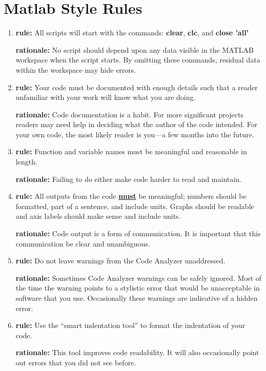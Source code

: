 \documentclass{tufte-book}
\theoremstyle{break}
\begin{document}
\chapter{Matlab Style Rules}
\begin{enumerate}
\item \textbf{rule:} All scripts will start with the commands: \textbf{clear}, \textbf{clc}, and \textbf{close 'all'}

\textbf{rationale:} No script should depend upon any data visible in the MATLAB workspace when the script starts.  By omitting these commands, residual data within the workspace may hide errors.

\item \textbf{rule:} Your code must be documented with enough details such that a reader unfamiliar with your work will know what you are doing.

\textbf{rationale:} Code documentation is a habit. For more significant projects readers may need help in deciding what the author of the code intended.  For your own code, the most likely reader is you---a few months into the future.

\item \textbf{rule:} Function and variable names must be meaningful and reasonable in length.

\textbf{rationale:} Failing to do either make code harder to read and maintain.

\item \textbf{rule:} All outputs from the code \underline{\textbf{must}} be meaningful; numbers should be formatted, part of a sentence, and include units. Graphs should be readable and axis labels should make sense and include units.

\textbf{rationale:} Code output is a form of communication. It is important that this communication be clear and unambiguous.

\item \textbf{rule:} Do not leave warnings from the Code Analyzer unaddressed.

\textbf{rationale:} Sometimes Code Analyzer warnings can be safely ignored.  Most of the time the warning points to a stylistic error that would be unacceptable in software that you use. Occasionally these warnings are indicative of a hidden error.

\item \textbf{rule:} Use the ``smart indentation tool'' to format the indentation of your code.

\textbf{rationale:} This tool improves code readability. It will also occasionally point out errors that you did not see before.


\end{enumerate}
\end{document}
